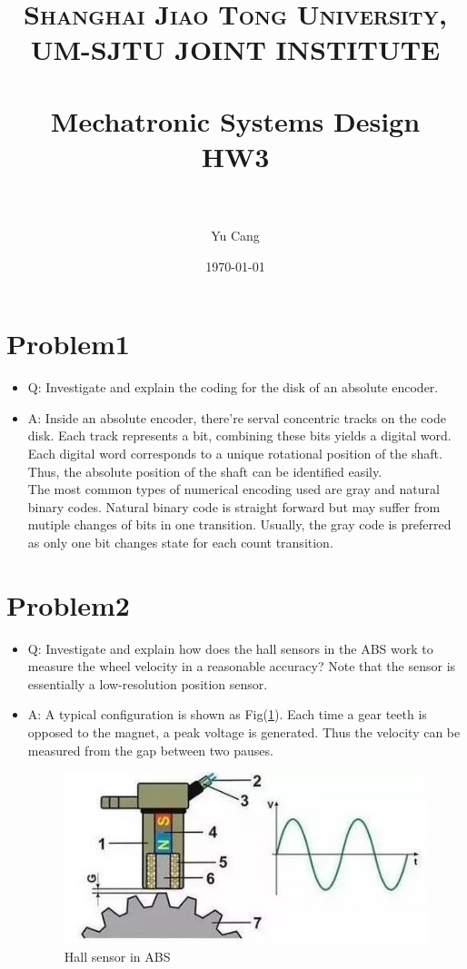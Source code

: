 \documentclass[paper=a4, fontsize=11pt]{scrartcl} %
\title{	
\normalfont \normalsize 
\textsc{Shanghai Jiao Tong University, UM-SJTU JOINT INSTITUTE} \\ [25pt] %
\horrule{0.5pt} \\[0.4cm] %
\huge Mechatronic Systems Design\\ HW3 \\ %
\horrule{2pt} \\[0.5cm] %
}
\author{Yu Cang \quad 018370210001} %
\date{\normalsize \today} %
\numberwithin{equation}{section} %
\numberwithin{figure}{section} %
\numberwithin{table}{section} %
\begin{document}
\maketitle %

\section*{Problem1}
	\begin{itemize}
		\item Q: Investigate and explain the coding for the disk of an absolute encoder.
		
		\item A: Inside an absolute encoder, there're serval concentric tracks on the code disk.
				 Each track represents a bit, combining these bits yields a digital word. 
		Each digital word corresponds to a unique rotational position of the shaft. 
		Thus, the absolute position of the shaft can be identified easily.\\
		The most common types of numerical encoding used are gray and natural binary codes. Natural binary code is straight forward but may suffer from mutiple changes of bits in one transition. Usually, the gray code is preferred as only one bit changes state for each count transition. 
		
	\end{itemize}

\section*{Problem2}
	\begin{itemize}
		\item 
			Q: Investigate and explain how does the hall sensors in the ABS work to measure the wheel velocity in a reasonable accuracy? Note that the sensor is essentially a low-resolution position sensor.
		
		\item 
			A: A typical configuration is shown as Fig(\ref{fig:hall}). Each time a gear teeth is opposed to the magnet, a peak voltage is generated. Thus the velocity can be measured from the gap between two pauses.
			
			\begin{figure}[!htbp]
				\centering
				\includegraphics{hall.jpeg}
				\caption{Hall sensor in ABS}
				\label{fig:hall}
			\end{figure}

		
	\end{itemize}
\end{document}
